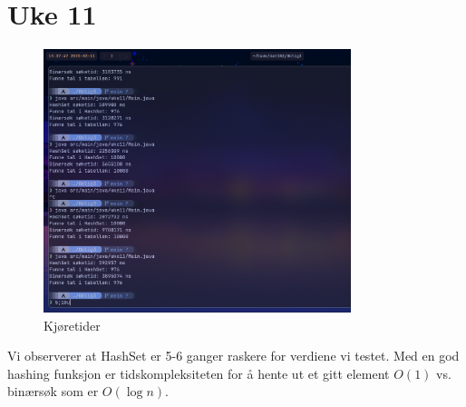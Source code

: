 \documentclass[12pt]{article}
\begin{document}
\break
\section*{Uke 11} 
\begin{figure}[h]
    \centering 
    \includegraphics[width=0.8\textwidth]{./HashSetBinaryRuntime.png}
    \caption{Kjøretider}
    \label{fig:hashbinaryruntimes}
\end{figure}

\noindent
Vi observerer at HashSet er 5-6 ganger raskere for verdiene vi testet. 
Med en god hashing funksjon er tidskompleksiteten for å hente ut et gitt element 
\(O(1)\) vs. binærsøk som er \(O(\log n)\).
\end{document}
